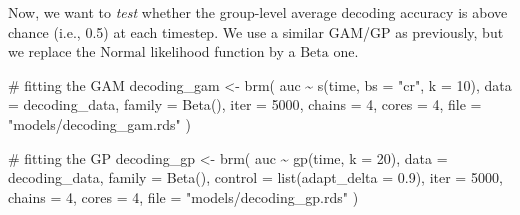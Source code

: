 \documentclass[
  doc,
  floatsintext,
  longtable,
  a4paper,
  nolmodern,
  notxfonts,
  notimes,
  colorlinks=true,linkcolor=blue,citecolor=blue,urlcolor=blue]{apa7}
\newenvironment{Shaded}{\begin{snugshade}}{\end{snugshade}}
\newcommand{\AttributeTok}[1]{\textcolor[rgb]{0.40,0.45,0.13}{#1}}
\newcommand{\CommentTok}[1]{\textcolor[rgb]{0.37,0.37,0.37}{#1}}
\newcommand{\DecValTok}[1]{\textcolor[rgb]{0.68,0.00,0.00}{#1}}
\newcommand{\FloatTok}[1]{\textcolor[rgb]{0.68,0.00,0.00}{#1}}
\newcommand{\FunctionTok}[1]{\textcolor[rgb]{0.28,0.35,0.67}{#1}}
\newcommand{\NormalTok}[1]{\textcolor[rgb]{0.00,0.23,0.31}{#1}}
\newcommand{\OtherTok}[1]{\textcolor[rgb]{0.00,0.23,0.31}{#1}}
\newcommand{\SpecialCharTok}[1]{\textcolor[rgb]{0.37,0.37,0.37}{#1}}
\newcommand{\StringTok}[1]{\textcolor[rgb]{0.13,0.47,0.30}{#1}}
\begin{document}
Now, we want to \emph{test} whether the group-level average decoding
accuracy is above chance (i.e., 0.5) at each timestep. We use a similar
GAM/GP as previously, but we replace the \(\mathrm{Normal}\) likelihood
function by a \(\mathrm{Beta}\) one.

\begin{Shaded}
\begin{Highlighting}[]
\CommentTok{\# fitting the GAM}
\NormalTok{decoding\_gam }\OtherTok{\textless{}{-}} \FunctionTok{brm}\NormalTok{(}
\NormalTok{    auc }\SpecialCharTok{\textasciitilde{}} \FunctionTok{s}\NormalTok{(time, }\AttributeTok{bs =} \StringTok{"cr"}\NormalTok{, }\AttributeTok{k =} \DecValTok{10}\NormalTok{),}
    \AttributeTok{data =}\NormalTok{ decoding\_data,}
    \AttributeTok{family =} \FunctionTok{Beta}\NormalTok{(),}
    \AttributeTok{iter =} \DecValTok{5000}\NormalTok{,}
    \AttributeTok{chains =} \DecValTok{4}\NormalTok{,}
    \AttributeTok{cores =} \DecValTok{4}\NormalTok{,}
    \AttributeTok{file =} \StringTok{"models/decoding\_gam.rds"}
\NormalTok{    )}
\end{Highlighting}
\end{Shaded}

\begin{Shaded}
\begin{Highlighting}[]
\CommentTok{\# fitting the GP}
\NormalTok{decoding\_gp }\OtherTok{\textless{}{-}} \FunctionTok{brm}\NormalTok{(}
\NormalTok{    auc }\SpecialCharTok{\textasciitilde{}} \FunctionTok{gp}\NormalTok{(time, }\AttributeTok{k =} \DecValTok{20}\NormalTok{),}
    \AttributeTok{data =}\NormalTok{ decoding\_data,}
    \AttributeTok{family =} \FunctionTok{Beta}\NormalTok{(),}
    \AttributeTok{control =} \FunctionTok{list}\NormalTok{(}\AttributeTok{adapt\_delta =} \FloatTok{0.9}\NormalTok{),}
    \AttributeTok{iter =} \DecValTok{5000}\NormalTok{,}
    \AttributeTok{chains =} \DecValTok{4}\NormalTok{,}
    \AttributeTok{cores =} \DecValTok{4}\NormalTok{,}
    \AttributeTok{file =} \StringTok{"models/decoding\_gp.rds"}
\NormalTok{    )}
\end{Highlighting}
\end{Shaded}
\end{document}
